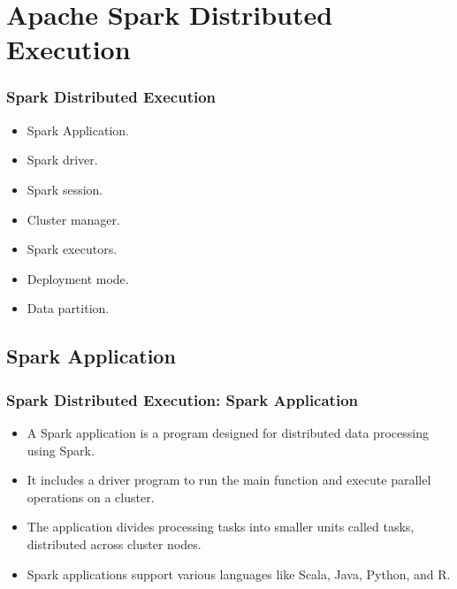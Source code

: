 

\section{Apache Spark Distributed Execution}\label{sec:apache-spark-distributed-execution}
\begin{frame}
    \frametitle{Spark Distributed Execution}
    \begin{itemize}
        \item Spark Application. 
        \item Spark driver. 
        \item Spark session. 
        \item Cluster manager. 
        \item Spark executors. 
        \item Deployment mode. 
        \item Data partition. 
    \end{itemize}
\end{frame}

\subsection{Spark Application}\label{subsec:spark-application}
\begin{frame}
    \frametitle{Spark Distributed Execution: Spark Application}

    \begin{itemize}
        \item A Spark application is a program designed for distributed data processing using Spark.
        \item It includes a driver program to run the main function and execute parallel operations on a cluster.
        \item The application divides processing tasks into smaller units called tasks, distributed across cluster nodes.
        \item Spark applications support various languages like Scala, Java, Python, and R.
    \end{itemize}

\end{frame}

